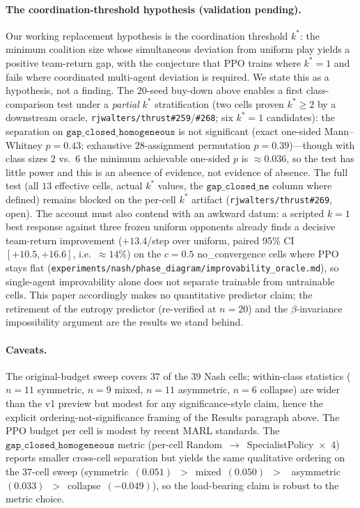 \documentclass{anvil-paper}
\begin{document}
\paragraph{The coordination-threshold hypothesis (validation pending).}
Our working replacement hypothesis is the coordination threshold
$k^{*}$: the minimum coalition size whose simultaneous deviation from
uniform play yields a positive team-return gap, with the conjecture that
PPO trains where $k^{*}{=}1$ and fails where coordinated multi-agent
deviation is required. We state this as a hypothesis, not a finding.
The $20$-seed buy-down above enables a first class-comparison test
under a \emph{partial} $k^{*}$ stratification (two cells proven
$k^{*}{\geq}2$ by a downstream oracle,
\texttt{rjwalters/thrust\#259}/\texttt{\#268}; six $k^{*}{=}1$
candidates): the separation on $\texttt{gap\_closed\_homogeneous}$ is
not significant (exact one-sided Mann--Whitney $p{=}0.43$; exhaustive
$28$-assignment permutation $p{=}0.39$)---though with class sizes $2$
vs.\ $6$ the minimum achievable one-sided $p$ is ${\approx}0.036$, so
the test has little power and this is an absence of evidence, not
evidence of absence. The full test (all $13$ effective cells, actual
$k^{*}$ values, the $\texttt{gap\_closed\_ne}$ column where defined)
remains blocked on the per-cell $k^{*}$ artifact
(\texttt{rjwalters/thrust\#269}, open). The account must also contend with an awkward datum: a
scripted $k{=}1$ best response against three frozen uniform opponents
already finds a decisive team-return improvement ($+13.4$/step over
uniform, paired 95\% CI $[+10.5, +16.6]$, i.e.\ ${\approx}14\%$) on the
$c{=}0.5$
\textsf{no\_convergence} cells where PPO stays flat
(\texttt{experiments/nash/phase\_diagram/improvability\_oracle.md}), so
single-agent improvability alone does not separate trainable from
untrainable cells. This paper accordingly makes no quantitative
predictor claim; the retirement of the entropy predictor (re-verified
at $n{=}20$) and the $\beta$-invariance impossibility argument are the
results we stand behind.

\paragraph{Caveats.}
The original-budget sweep covers $37$ of the $39$ Nash cells; within-class
statistics ($n{=}11$ symmetric, $n{=}9$ mixed, $n{=}11$ asymmetric,
$n{=}6$ collapse) are wider than the v1 preview but modest for any
significance-style claim, hence the explicit ordering-not-significance
framing of the Results paragraph above. The PPO budget per cell is
modest by recent MARL standards. The $\texttt{gap\_closed\_homogeneous}$
metric (per-cell Random~$\to$~SpecialistPolicy~$\times$~4) reports
smaller cross-cell separation but yields the same qualitative ordering
on the $37$-cell sweep
(\textsf{symmetric}~$(0.051)$~$>$~\textsf{mixed}~$(0.050)$~$>$~%
\textsf{asymmetric}~$(0.033)$~$>$~\textsf{collapse}~$(-0.049)$), so the
load-bearing claim is robust to the metric choice.
\end{document}
